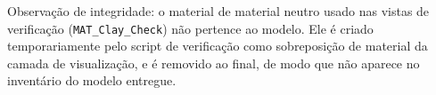 Observa{\c{c}}\~ao de integridade: o material de material neutro usado nas vistas de
verifica{\c{c}}\~ao (\texttt{MAT\_Clay\_Check}) n\~ao pertence ao modelo. Ele \'e criado
temporariamente pelo script de verifica{\c{c}}\~ao como sobreposi{\c{c}}\~ao de
material da camada de visualiza{\c{c}}\~ao, e \'e removido ao final, de modo que n\~ao aparece
no invent\'ario do modelo entregue.
